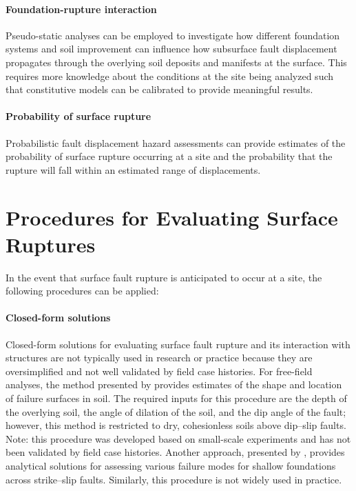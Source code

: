 \paragraph{Foundation-rupture interaction}
Pseudo-static analyses can be employed to investigate how different foundation systems and soil improvement can influence how subsurface fault displacement propagates through the overlying soil deposits and manifests at the surface. This requires more knowledge about the conditions at the site being analyzed such that constitutive models can be calibrated to provide meaningful results.

\paragraph{Probability of surface rupture}
Probabilistic fault displacement hazard assessments can provide estimates of the probability of surface rupture occurring at a site and the probability that the rupture will fall within an estimated range of displacements.

\section{Procedures for Evaluating Surface Ruptures}
\label{sec:eq_surface_rup_procedures}

In the event that surface fault rupture is anticipated to occur at a site, the following procedures can be applied:

\paragraph{Closed-form solutions}
Closed-form solutions for evaluating surface fault rupture and its interaction with structures are not typically used in research or practice because they are oversimplified and not well validated by field case histories. For free-field analyses, the method presented by \citet{cole1984influence} provides estimates of the shape and location of failure surfaces in soil. The required inputs for this procedure are the depth of the overlying soil, the angle of dilation of the soil, and the dip angle of the fault; however, this method is restricted to dry, cohesionless soils above dip--slip faults.  Note: this procedure was developed based on small-scale experiments and has not been validated by field case histories. Another approach, presented by \citet{berrill1983twodimensional}, provides analytical solutions for assessing various failure modes for shallow foundations across strike--slip faults. Similarly, this procedure is not widely used in practice.

